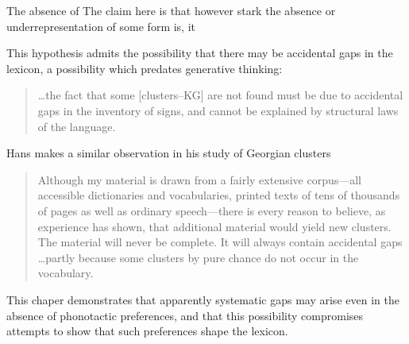 The absence of 
The claim here is that however stark the absence or underrepresentation of some form is, it 

This hypothesis admits the possibility that there may be accidental gaps in the lexicon, a possibility which predates generative thinking:

\begin{quotation}
\ldots the fact that some [clusters--KG] are not found must be due to accidental gaps in the inventory of signs, and cannot be explained by structural laws of the language. \citep[][16]{Fischer-Jorgensen1952}
\end{quotation}

\noindent
Hans \citeauthor{Vogt1954} makes a similar observation in his study of Georgian clusters

\begin{quotation}
Although my material is drawn from a fairly extensive corpus---all accessible dictionaries and vocabularies, printed texts of tens of thousands of pages as well as ordinary speech---there is every reason to believe, as experience has shown, that additional material would yield new clusters. The material will never be complete. It will always contain accidental gaps \ldots partly because some clusters by pure chance do not occur in the vocabulary. \citep[][30]{Vogt1954}
\end{quotation}

\citet{Chomsky1965}

This chaper demonstrates that apparently systematic gaps may arise even in the absence of phonotactic preferences, and that this possibility compromises attempts to show that such preferences shape the lexicon. 




